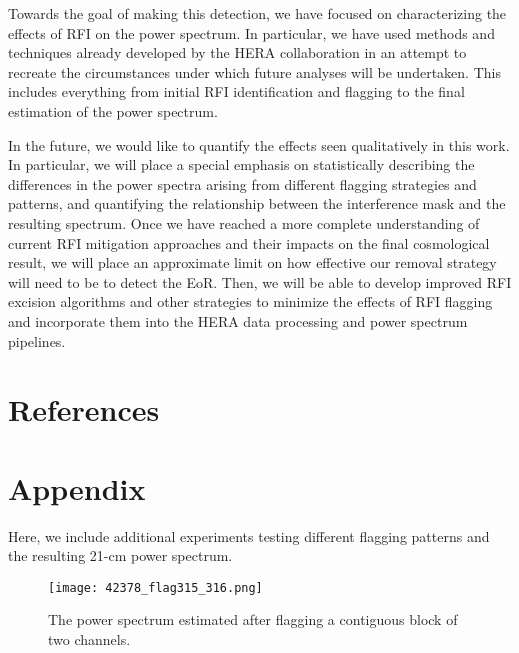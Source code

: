 \documentclass[12pt]{article}
\begin{document}
Towards the goal of making this detection, we have focused on characterizing the effects of RFI on the power spectrum. In particular, we have used methods and techniques already developed by the HERA collaboration in an attempt to recreate the circumstances under which future analyses will be undertaken. This includes everything from initial RFI identification and flagging to the final estimation of the power spectrum.

In the future, we would like to quantify the effects seen qualitatively in this work. In particular, we will place a special emphasis on statistically describing the differences in the power spectra arising from different flagging strategies and patterns, and quantifying the relationship between the interference mask and the resulting spectrum. Once we have reached a more complete understanding of current RFI mitigation approaches and their impacts on the final cosmological result, we will place an approximate limit on how effective our removal strategy will need to be to detect the EoR. Then, we will be able to develop improved RFI excision algorithms and other strategies to minimize the effects of RFI flagging and incorporate them into the HERA data processing and power spectrum pipelines. \vspace{3mm}

\tocless\section{\hypertarget{references}{References}}



\newpage
\tocless\section{\hypertarget{appendix}{Appendix}}

Here, we include additional experiments testing different flagging patterns and the resulting 21-cm power spectrum.

\begin{figure}[th]
	\centering
	\texttt{[image: 42378\_flag315\_316.png]}
	\caption[Power spectrum calculated with flagged time integrations and two contiguous flagged channels]{The power spectrum estimated after flagging a contiguous block of two channels.}
	\label{fig:flag_chan315_316}
\end{figure}
\end{document}
